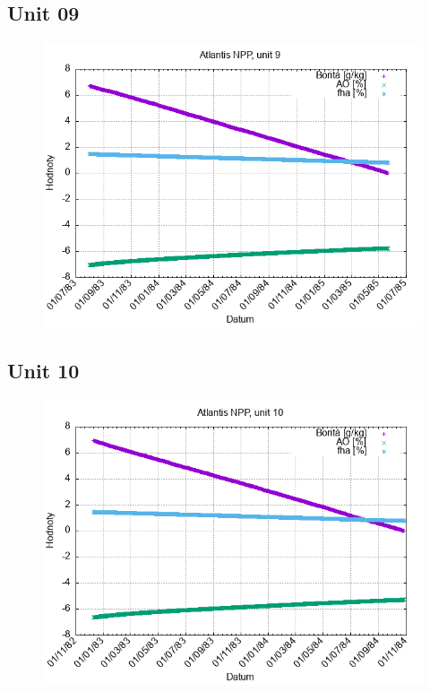 \documentclass{article}
\begin{document}
\subsection*{Unit 09}
\begin{figure}[h!]
\centering
\includegraphics[width=14cm]{./grafy/Atlantis09.png}
\end{figure}
\clearpage
\subsection*{Unit 10}
\begin{figure}[h!]
\centering
\includegraphics[width=14cm]{./grafy/Atlantis10.png}
\end{figure}
\clearpage
\end{document}

